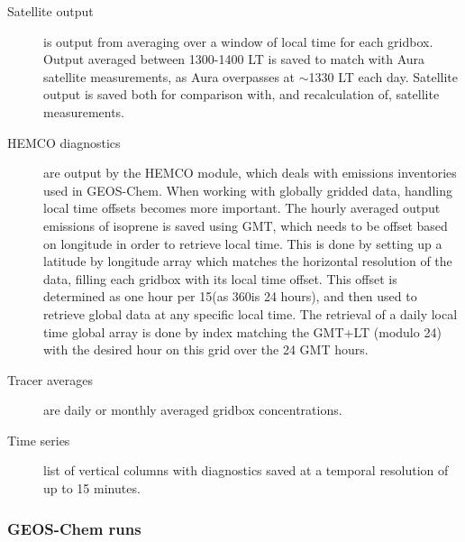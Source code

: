       \begin{description}
        \item[Satellite output]%
        is output from averaging over a window of local time for each gridbox. 
        Output averaged between 1300-1400 LT is saved to match with Aura satellite measurements, as Aura overpasses at $\sim$1330 LT each day.
        Satellite output is saved both for comparison with, and recalculation of, satellite measurements.
        \item[HEMCO diagnostics]%
        are output by the HEMCO module, which deals with emissions inventories used in GEOS-Chem.
        When working with globally gridded data, handling local time offsets becomes more important.
        The hourly averaged output emissions of isoprene is saved using GMT, which needs to be offset based on longitude in order to retrieve local time.
        This is done by setting up a latitude by longitude array which matches the horizontal resolution of the data, filling each gridbox with its local time offset.
        This offset is determined as one hour per 15\degr (as 360\degr is 24 hours), and then used to retrieve global data at any specific local time.
        The retrieval of a daily local time global array is done by index matching the GMT+LT (modulo 24) with the desired hour on this grid over the 24 GMT hours.
        \item[Tracer averages]%
        are daily or monthly averaged gridbox concentrations. 
        \item[Time series]%
        list of vertical columns with diagnostics saved at a temporal resolution of up to 15 minutes.
        
        
      \end{description}
    
    \subsubsection{GEOS-Chem runs}
      \label{Model:GC:simulations:runs}
      
